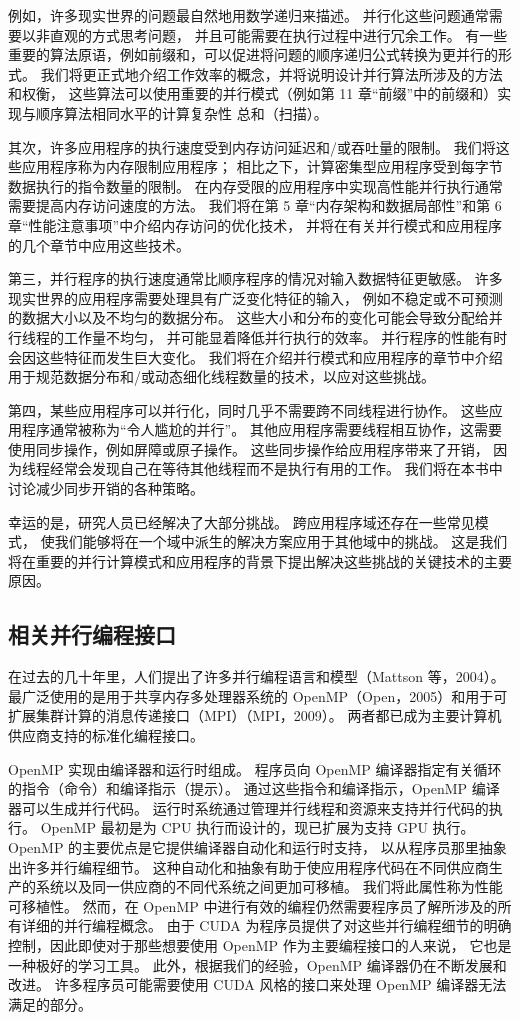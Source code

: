 例如，许多现实世界的问题最自然地用数学递归来描述。 并行化这些问题通常需要以非直观的方式思考问题，
并且可能需要在执行过程中进行冗余工作。 有一些重要的算法原语，例如前缀和，可以促进将问题的顺序递归公式转换为更并行的形式。 
我们将更正式地介绍工作效率的概念，并将说明设计并行算法所涉及的方法和权衡，
这些算法可以使用重要的并行模式（例如第 11 章“前缀”中的前缀和）实现与顺序算法相同水平的计算复杂性 总和（扫描）。

其次，许多应用程序的执行速度受到内存访问延迟和/或吞吐量的限制。 我们将这些应用程序称为内存限制应用程序； 
相比之下，计算密集型应用程序受到每字节数据执行的指令数量的限制。 
在内存受限的应用程序中实现高性能并行执行通常需要提高内存访问速度的方法。 
我们将在第 5 章“内存架构和数据局部性”和第 6 章“性能注意事项”中介绍内存访问的优化技术，
并将在有关并行模式和应用程序的几个章节中应用这些技术。

第三，并行程序的执行速度通常比顺序程序的情况对输入数据特征更敏感。 许多现实世界的应用程序需要处理具有广泛变化特征的输入，
例如不稳定或不可预测的数据大小以及不均匀的数据分布。 这些大小和分布的变化可能会导致分配给并行线程的工作量不均匀，
并可能显着降低并行执行的效率。 并行程序的性能有时会因这些特征而发生巨大变化。 
我们将在介绍并行模式和应用程序的章节中介绍用于规范数据分布和/或动态细化线程数量的技术，以应对这些挑战。

第四，某些应用程序可以并行化，同时几乎不需要跨不同线程进行协作。 这些应用程序通常被称为“令人尴尬的并行”。 
其他应用程序需要线程相互协作，这需要使用同步操作，例如屏障或原子操作。 这些同步操作给应用程序带来了开销，
因为线程经常会发现自己在等待其他线程而不是执行有用的工作。 我们将在本书中讨论减少同步开销的各种策略。

幸运的是，研究人员已经解决了大部分挑战。 跨应用程序域还存在一些常见模式，
使我们能够将在一个域中派生的解决方案应用于其他域中的挑战。 
这是我们将在重要的并行计算模式和应用程序的背景下提出解决这些挑战的关键技术的主要原因。

\subsection{相关并行编程接口}
在过去的几十年里，人们提出了许多并行编程语言和模型（Mattson 等，2004）。 
最广泛使用的是用于共享内存多处理器系统的 OpenMP（Open，2005）和用于可扩展集群计算的消息传递接口（MPI）（MPI，2009）。 
两者都已成为主要计算机供应商支持的标准化编程接口。

OpenMP 实现由编译器和运行时组成。 程序员向 OpenMP 编译器指定有关循环的指令（命令）和编译指示（提示）。 
通过这些指令和编译指示，OpenMP 编译器可以生成并行代码。 运行时系统通过管理并行线程和资源来支持并行代码的执行。 
OpenMP 最初是为 CPU 执行而设计的，现已扩展为支持 GPU 执行。 OpenMP 的主要优点是它提供编译器自动化和运行时支持，
以从程序员那里抽象出许多并行编程细节。 
这种自动化和抽象有助于使应用程序代码在不同供应商生产的系统以及同一供应商的不同代系统之间更加可移植。 
我们将此属性称为性能可移植性。 然而，在 OpenMP 中进行有效的编程仍然需要程序员了解所涉及的所有详细的并行编程概念。 
由于 CUDA 为程序员提供了对这些并行编程细节的明确控制，因此即使对于那些想要使用 OpenMP 作为主要编程接口的人来说，
它也是一种极好的学习工具。 此外，根据我们的经验，OpenMP 编译器仍在不断发展和改进。 
许多程序员可能需要使用 CUDA 风格的接口来处理 OpenMP 编译器无法满足的部分。

